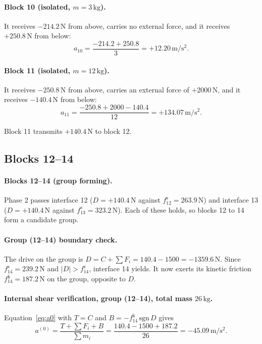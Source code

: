 \documentclass[11pt,a4paper]{article}
\begin{document}
\paragraph{Block 10 (isolated, $m=3\,\mathrm{kg}$).} It receives $-214.2\,\mathrm{N}$ from above, carries no external force, and it receives $+250.8\,\mathrm{N}$ from below:\[a_{10}=\dfrac{-214.2 + 250.8}{3}=+12.20\,\mathrm{m/s^2}.\]

\paragraph{Block 11 (isolated, $m=12\,\mathrm{kg}$).} It receives $-250.8\,\mathrm{N}$ from above, carries an external force of $+2000\,\mathrm{N}$, and it receives $-140.4\,\mathrm{N}$ from below:\[a_{11}=\dfrac{-250.8 + 2000 - 140.4}{12}=+134.07\,\mathrm{m/s^2}.\]

Block 11 transmits $+140.4\,\mathrm{N}$ to block 12.

\subsection{Blocks 12--14}
\paragraph{Blocks 12--14 (group forming).} Phase 2 passes interface 12 ($D=+140.4\,\mathrm{N}$ against $f^{\mathrm s}_{12}=263.9\,\mathrm{N}$) and interface 13 ($D=+140.4\,\mathrm{N}$ against $f^{\mathrm s}_{13}=323.2\,\mathrm{N}$). Each of these holds, so blocks 12 to 14 form a candidate group.

\paragraph{Group (12--14) boundary check.} The drive on the group is $D=C+\sum F_i=140.4 - 1500=-1359.6\,\mathrm{N}$. Since $f^{\mathrm s}_{14}=239.2\,\mathrm{N}$ and $|D|>f^{\mathrm s}_{14}$, interface 14 yields. It now exerts its kinetic friction $f^{\mathrm k}_{14}=187.2\,\mathrm{N}$ on the group, opposite to $D$.

\paragraph{Internal shear verification, group (12--14), total mass $26\,\mathrm{kg}$.} Equation~\eqref{eq:a0} with $T=C$ and $B=-f^{\mathrm k}_{14}\,\mathrm{sgn}\,D$ gives\[a^{(0)}=\dfrac{T+\sum F_i+B}{\sum m_i}=\dfrac{140.4 - 1500 + 187.2}{26}=-45.09\,\mathrm{m/s^2}.\]
\end{document}
